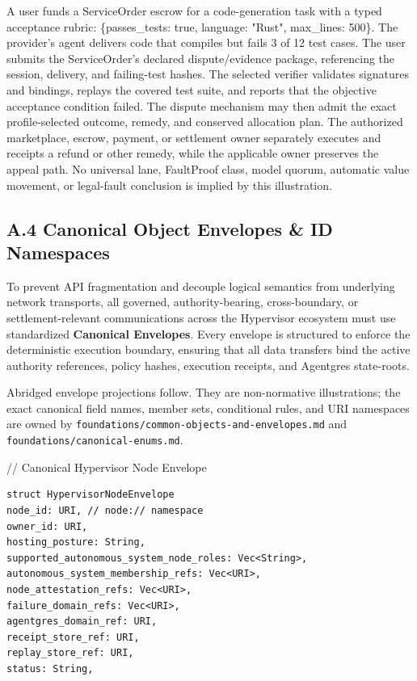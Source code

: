 \documentclass[
  11pt,
]{article}
\begin{document}
A user funds a ServiceOrder escrow for a code-generation task with a typed
acceptance rubric:
\{passes\_tests: true, language: "Rust", max\_lines: 500\}. The
provider's agent delivers code that compiles but fails 3 of 12 test
cases. The user submits the ServiceOrder's declared dispute/evidence package,
referencing the session, delivery, and failing-test hashes. The selected
verifier validates signatures and bindings, replays the covered test suite,
and reports that the objective acceptance condition failed. The dispute
mechanism may then admit the exact profile-selected outcome, remedy, and
conserved allocation plan. The authorized marketplace, escrow, payment, or
settlement owner separately executes and receipts a refund or other remedy,
while the applicable owner preserves the appeal path. No universal lane,
FaultProof class, model quorum, automatic value movement, or legal-fault
conclusion is implied by this illustration.

\hypertarget{a.4-canonical-object-envelopes-id-namespaces}{%
\subsection{A.4 Canonical Object Envelopes \& ID
Namespaces}\label{a.4-canonical-object-envelopes-id-namespaces}}

To prevent API fragmentation and decouple logical semantics from
underlying network transports, all governed, authority-bearing,
cross-boundary, or settlement-relevant communications across the
Hypervisor ecosystem must use standardized \textbf{Canonical Envelopes}.
Every envelope is structured to enforce the deterministic execution
boundary, ensuring that all data transfers bind the active authority
references, policy hashes, execution receipts, and Agentgres
state-roots.

Abridged envelope projections follow. They are non-normative illustrations;
the exact canonical field names, member sets, conditional rules, and URI
namespaces are owned by
\texttt{foundations/common-objects-and-envelopes.md} and
\texttt{foundations/canonical-enums.md}.

// Canonical Hypervisor Node Envelope

\begin{lstlisting}[language=rustioi]
struct HypervisorNodeEnvelope
node_id: URI, // node:// namespace
owner_id: URI,
hosting_posture: String,
supported_autonomous_system_node_roles: Vec<String>,
autonomous_system_membership_refs: Vec<URI>,
node_attestation_refs: Vec<URI>,
failure_domain_refs: Vec<URI>,
agentgres_domain_ref: URI,
receipt_store_ref: URI,
replay_store_ref: URI,
status: String,
\end{lstlisting}
\end{document}
